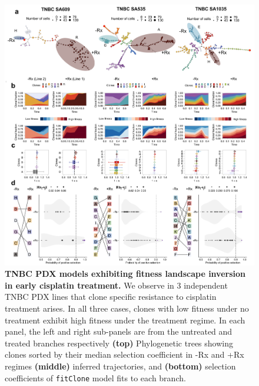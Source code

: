 
\begin{figure}
\centering
\includegraphics[width=\textwidth]{Figures/landscapefitness.png}
	
\caption[Fitness landscape reversal in early cisplatin treatment in TNBC PDX models.]
	{\small
	\textbf{TNBC PDX models exhibiting fitness landscape inversion in early cisplatin treatment.}
	     We observe in 3 independent TNBC PDX lines that clone specific resistance to cisplatin treatment arises. In all three cases, clones with low fitness under no treatment exhibit high fitness under the treatment regime. In each panel, the left and right sub-panels are from the untreated and treated branches respectively \textbf{(top)} Phylogenetic trees showing clones sorted by their median selection coefficient in -Rx and +Rx regimes  \textbf{(middle)} inferred trajectories, and  \textbf{(bottom)} selection coefficients of \texttt{fitClone} model fits to each branch.
	}
	\label{fig:landscapefitness}
\end{figure}


